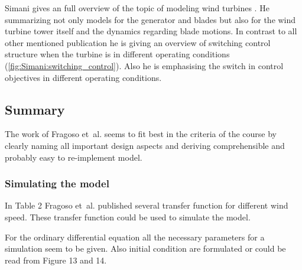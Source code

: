 Simani gives an full overview of the topic of modeling wind turbines \cite{Simani_2015}.
He summarizing not only models for the generator and blades but also for the wind turbine tower itself and the dynamics regarding blade motions.
In contrast to all other mentioned publication he is giving an overview of switching control structure when the turbine is in different operating conditions (\autoref{fig:Simani:switching_control}).
Also he is emphasising the switch in control objectives in different operating conditions.

\subsection{Summary}

The work of Fragoso et~al. seems to fit best in the criteria of the course by clearly naming all important design aspects and deriving comprehensible and probably easy to re-implement model.

\subsubsection{Simulating the model}

In Table 2 Fragoso et~al. published several transfer function for different wind speed.
These transfer function could be used to simulate the model.

For the ordinary differential equation all the  necessary parameters for a simulation seem to be given.
Also initial condition are formulated or could be read from Figure 13 and 14.